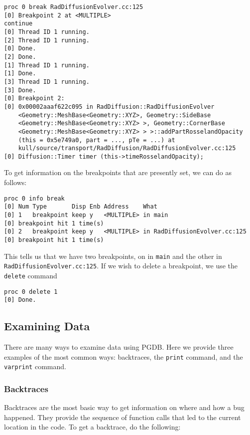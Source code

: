 \documentclass{refart}
\begin{document}
\begin{Verbatim}
proc 0 break RadDiffusionEvolver.cc:125  
[0] Breakpoint 2 at <MULTIPLE>
continue
[0] Thread ID 1 running.
[2] Thread ID 1 running.
[0] Done.
[2] Done.
[1] Thread ID 1 running.
[1] Done.
[3] Thread ID 1 running.
[3] Done.
[0] Breakpoint 2:
[0] 0x00002aaaf622c095 in RadDiffusion::RadDiffusionEvolver
    <Geometry::MeshBase<Geometry::XYZ>, Geometry::SideBase
    <Geometry::MeshBase<Geometry::XYZ> >, Geometry::CornerBase
    <Geometry::MeshBase<Geometry::XYZ> > >::addPartRosselandOpacity
    (this = 0x5e749a0, part = ..., pTe = ...) at
    kull/source/transport/RadDiffusion/RadDiffusionEvolver.cc:125
[0] Diffusion::Timer timer (this->timeRosselandOpacity);
\end{Verbatim}

To get information on the breakpoints that are presently set, we can do as follows:

\begin{Verbatim}
proc 0 info break
[0] Num Type       Disp Enb Address    What
[0] 1   breakpoint keep y   <MULTIPLE> in main
[0] breakpoint hit 1 time(s)
[0] 2   breakpoint keep y   <MULTIPLE> in RadDiffusionEvolver.cc:125
[0] breakpoint hit 1 time(s)
\end{Verbatim}

This tells us that we have two breakpoints, on in \texttt{main} and the other in \texttt{RadDiffusionEvolver.cc:125}. If we wish to delete a breakpoint, we use the \texttt{delete} command

\begin{Verbatim}
proc 0 delete 1
[0] Done.
\end{Verbatim}

\subsection{Examining Data}

There are many ways to examine data using PGDB. Here we provide three examples of the most common ways: backtraces, the \texttt{print} command, and the \texttt{varprint} command.

\subsubsection{Backtraces}

Backtraces are the most basic way to get information on where and how a bug happened. They provide the sequence of function calls that led to the current location in the code. To get a backtrace, do the following:
\end{document}
